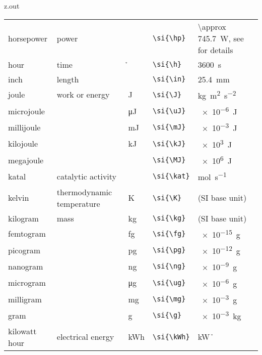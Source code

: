 \begin{VerbatimOut}{z.out}
{\begin{longtable}{@{}P{1.4in}P{1in}llP{1.8in}@{}}
    \vsp
    horsepower&
      power&
      \si{\hp}&
      \verb+\si{\hp}+&
      \SI{\approx 745.7}{\W},
        see \cite{wikipedia-horsepower} for details\\  %
    \vsp
    hour&
      time&
      \si{\h}&
      \verb+\si{\h}+&
      \SI{3600}{\s}\\
    \vsp
    inch&
      length&
      \si{\in}&
      \verb+\si{\in}+&
      \SI{25.4}{\mm}\\  %
    \vsp
    joule&
      work or energy&
      \si{\J}&
      \verb+\si{\J}+&
      \si{\kg\m\squared\per\s\squared}\\
    \quad microjoule&
      \ditto&
      \si{\uJ}&
      \verb+\si{\uJ}+&
      \SI{e-6}{\J}\\
    \quad millijoule&
      \ditto&
      \si{\mJ}&
      \verb+\si{\mJ}+&
      \SI{e-3}{\J}\\
    \quad kilojoule&
      \ditto&
      \si{\kJ}&
      \verb+\si{\kJ}+&
      \SI{e3}{\J}\\
    \quad megajoule&
      \ditto&
      \si{\MJ}&
      \verb+\si{\MJ}+&
      \SI{e6}{\J}\\
    \vsp
    katal&
      catalytic activity&
      \si{\kat}&
      \verb+\si{\kat}+&
      \si{\mol\per\s}\\
    \vsp
    kelvin&
      thermodynamic temperature&
      \si{\K}&
      \verb+\si{\K}+&
      (SI base unit)\\
    \vsp
    kilogram&
      mass&
      \si{\kg}&
      \verb+\si{\kg}+&
      (SI base unit)\\
    \quad femtogram&
      \ditto&
      \si{\fg}&
      \verb+\si{\fg}+&
      \SI{e-15}{\g}\\
    \quad picogram&
      \ditto&
      \si{\pg}&
      \verb+\si{\pg}+&
      \SI{e-12}{\g}\\
    \quad nanogram&
      \ditto&
      \si{\ng}&
      \verb+\si{\ng}+&
      \SI{e-9}{\g}\\
    \quad microgram&
      \ditto&
      \si{\ug}&
      \verb+\si{\ug}+&
      \SI{e-6}{\g}\\
    \quad milligram&
      \ditto&
      \si{\mg}&
      \verb+\si{\mg}+&
      \SI{e-3}{\g}\\
    \quad gram&
      \ditto&
      \si{\g}&
      \verb+\si{\g}+&
      \SI{e-3}{\kg}\\
    \vsp
    kilowatt hour&
      electrical energy&
      \si{\kWh}&
      \verb+\si{\kWh}+&
      \si{\kW\h}\\

\end{longtable}}
\end{VerbatimOut}
